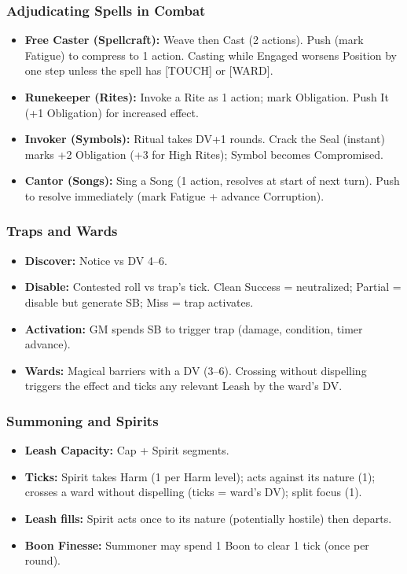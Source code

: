 \subsubsection{Adjudicating Spells in Combat}
\begin{itemize}
  \item \textbf{Free Caster (Spellcraft):} Weave then Cast (2 actions). Push (mark Fatigue) to compress to 1 action. Casting while Engaged worsens Position by one step unless the spell has [TOUCH] or [WARD].
  \item \textbf{Runekeeper (Rites):} Invoke a Rite as 1 action; mark Obligation. Push It (+1 Obligation) for increased effect.
  \item \textbf{Invoker (Symbols):} Ritual takes DV+1 rounds. Crack the Seal (instant) marks +2 Obligation (+3 for High Rites); Symbol becomes Compromised.
  \item \textbf{Cantor (Songs):} Sing a Song (1 action, resolves at start of next turn). Push to resolve immediately (mark Fatigue + advance Corruption).
\end{itemize}

\subsubsection{Traps and Wards}
\begin{itemize}
  \item \textbf{Discover:} Notice vs DV 4--6.
  \item \textbf{Disable:} Contested roll vs trap's tick. Clean Success = neutralized; Partial = disable but generate SB; Miss = trap activates.
  \item \textbf{Activation:} GM spends SB to trigger trap (damage, condition, timer advance).
  \item \textbf{Wards:} Magical barriers with a DV (3--6). Crossing without dispelling triggers the effect and ticks any relevant Leash by the ward's DV.
\end{itemize}

\subsubsection{Summoning and Spirits}
\begin{itemize}
  \item \textbf{Leash Capacity:} Cap + Spirit segments.
  \item \textbf{Ticks:} Spirit takes Harm (1 per Harm level); acts against its nature (1); crosses a ward without dispelling (ticks = ward's DV); split focus (1).
  \item \textbf{Leash fills:} Spirit acts once to its nature (potentially hostile) then departs.
  \item \textbf{Boon Finesse:} Summoner may spend 1 Boon to clear 1 tick (once per round).
\end{itemize}

